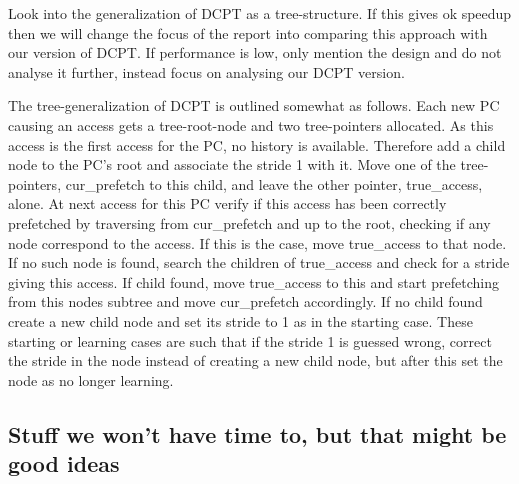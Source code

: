 \documentclass[12pt,journal,compsoc]{IEEEtran}
\begin{document}
Look into the generalization of DCPT as a tree-structure. If this gives
ok speedup then we will change the focus of the report into comparing this
approach with our version of DCPT. If performance is low, only mention the
design and do not analyse it further, instead focus on analysing our
DCPT version.

The tree-generalization of DCPT is outlined somewhat as follows. Each new PC
causing an access gets a tree-root-node and two tree-pointers allocated.
As this access is the first access for the PC, no history is available.
Therefore add a child node to the PC's root and associate the stride 1 with it.
Move one of the tree-pointers, cur\_prefetch to this child, and leave the other
pointer, true\_access, alone. At next access for this PC verify if this access
has been correctly prefetched by traversing from cur\_prefetch and up to the
root, checking if any node correspond to the access. If this is the case,
move true\_access to that node. If no such node is found, search the children
of true\_access and check for a stride giving this access. If child found, move
true\_access to this and start prefetching from this nodes subtree and move
cur\_prefetch accordingly. If no child found create a new child node and set
its stride to 1 as in the starting case. These starting or learning cases
are such that if the stride 1 is guessed wrong, correct the stride in the node
instead of creating a new child node, but after this set the node as no longer
learning.

\subsection{Stuff we won't have time to, but that might be good ideas}




\ifCLASSOPTIONcompsoc
\else
\fi
\end{document}
